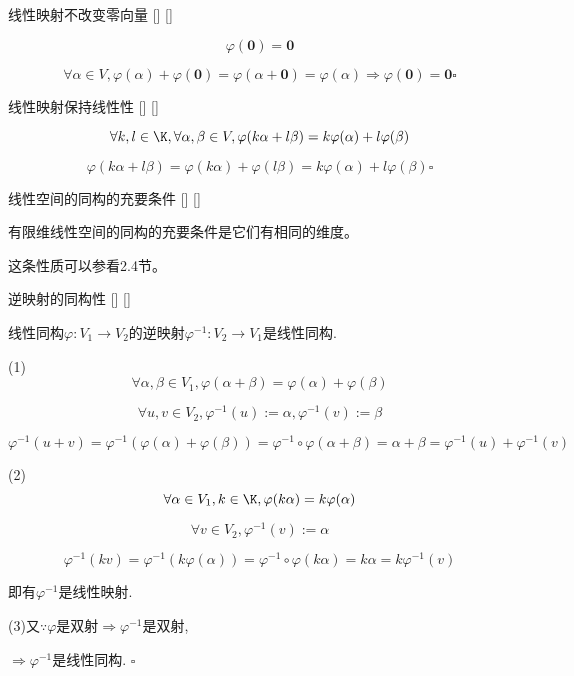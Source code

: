 \documentclass[UTF8]{ctexart}
\begin{document}
		\begin{ppt}
			[]
			{线性映射不改变零向量}
			[]
			[]

			$$\varphi(\mathbf{0})=\mathbf{0}$$
		\end{ppt}
  
		\begin{prf}
			
			$$\forall\alpha\in V, \varphi(\alpha)+\varphi(\mathbf{0})=\varphi(\alpha+\mathbf{0})=\varphi(\alpha)\Longrightarrow\varphi(\mathbf{0})=\mathbf{0}\square$$
		\end{prf}
  
		\begin{ppt}
			[]
			{线性映射保持线性性}
			[]
			[]

			$$\forall k,l\in\K, \forall \alpha, \beta\in V, \varphi(k\alpha+l\beta)=k\varphi(\alpha)+l\varphi(\beta)$$
		\end{ppt}
  
		\begin{prf}
			\[\varphi(k\alpha+l\beta)=\varphi(k\alpha)+\varphi(l\beta)=k\varphi(\alpha)+l\varphi(\beta)\square\]
		\end{prf}

		\begin{ppt}
			[]
			{线性空间的同构的充要条件}
			[]
			[]

			有限维线性空间的同构的充要条件是它们有相同的维度。
		\end{ppt}

		这条性质可以参看2.4节。
  
		\begin{ppt}
			[]
			{逆映射的同构性}
			[]
			[]

			线性同构$\varphi:V_1\to V_2$的逆映射$\varphi^{-1}:V_2\to V_1$是线性同构. 
		\end{ppt}
  
		\begin{prf}
			(1)$$\forall\alpha,\beta\in V_1, \varphi(\alpha+\beta)=\varphi(\alpha)+\varphi(\beta)$$
			
			$$\forall u,v\in V_2, \varphi^{-1}(u):=\alpha,\varphi^{-1}(v):=\beta$$
			
			$$\varphi^{-1}(u+v)=\varphi^{-1}(\varphi(\alpha)+\varphi(\beta))=\varphi^{-1}\circ\varphi(\alpha+\beta)=\alpha+\beta=\varphi^{-1}(u)+\varphi^{-1}(v)$$
			
			(2)$$\forall\alpha\in V_1,k\in\K,\varphi(k\alpha)=k\varphi(\alpha)$$
			
			$$\forall v\in V_2, \varphi^{-1}(v):=\alpha$$ 
			
			$$\varphi^{-1}(kv)=\varphi^{-1}(k\varphi(\alpha))=\varphi^{-1}\circ\varphi(k\alpha)=k\alpha=k\varphi^{-1}(v)$$
			
			即有$\varphi^{-1}$是线性映射. 
			
			(3)又$\because\varphi$是双射$\Longrightarrow\varphi^{-1}$是双射, 
			
			$\Longrightarrow\varphi^{-1}$是线性同构. $\square$
		\end{prf}
  
\end{document}
